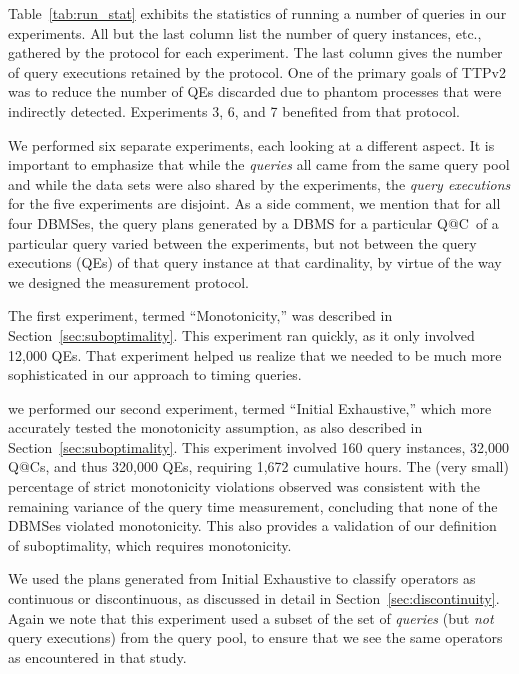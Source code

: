 \documentclass[prodmode,acmtods]{acmsmall}
\makeatletter
\def\QatC{Q{@}C}
\makeatother
\begin{document}
Table~\ref{tab:run_stat} exhibits the statistics of running a number of 
queries in our experiments. All but the last column list the number of query
instances, etc., gathered by the protocol for each experiment. The last
column gives the number of query executions retained by the protocol. One of
the primary goals of TTPv2 was to reduce the number of QEs discarded due to
phantom processes that were indirectly detected. Experiments 3, 6, and 7
benefited from that protocol.

We performed six separate experiments, each looking at a different
aspect. It is important to emphasize that while the {\em queries} all came
from the same query pool and while the data sets were also shared by the
experiments, the {\em query executions} for the five experiments are
disjoint. As a side comment, we mention that for all four \hbox{DBMSes}, the query
plans generated by a \hbox{DBMS} for a particular \QatC\ of a particular query
varied between the experiments, but not between the query executions (QEs) of that query
instance at that cardinality, by virtue of the way we designed the
measurement protocol.

The first experiment, termed ``Monotonicity,'' was described in
Section~\ref{sec:suboptimality}. This experiment ran quickly, as it
only involved 12,000 QEs. That experiment helped us realize that we needed
to be much more sophisticated in our approach to timing queries.

 we performed our
second experiment, termed ``Initial Exhaustive,'' which more accurately tested the
monotonicity assumption, as also described in Section~\ref{sec:suboptimality}.
This experiment involved 160 query instances, 32,000 \QatC s, and thus
320,000 QEs, requiring 1,672 cumulative hours.  The (very small) percentage
of strict monotonicity violations observed was consistent with the remaining
variance of the query time measurement, concluding that none of
the \hbox{DBMSes} violated monotonicity. This also provides a validation of
our definition of suboptimality, which requires monotonicity.

We used the plans generated from Initial Exhaustive to classify operators as
continuous or discontinuous, as discussed in detail in
Section~\ref{sec:discontinuity}. Again we note that this experiment used a subset of
the set of {\em queries} (but {\em not} query executions) from the query pool,
to ensure that we see the same operators as encountered in that
study.
\end{document}
